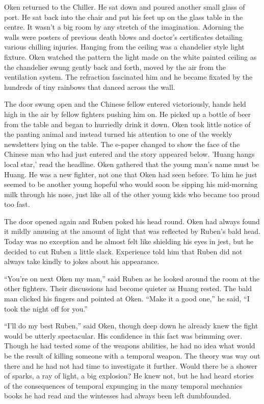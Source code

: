 Oken returned to the Chiller. He sat down and poured another small glass of port. He sat back into the chair and put his feet up on the glass table in the centre. It wasn't a big room by any stretch of the imagination. Adorning the walls were posters of previous death blows and doctor's certificates detailing various chilling injuries. Hanging from the ceiling was a chandelier style light fixture. Oken watched the pattern the light made on the white painted ceiling as the chandelier swung gently back and forth, moved by the air from the ventilation system. The refraction fascinated him and he became fixated by the hundreds of tiny rainbows that danced across the wall.

The door swung open and the Chinese fellow entered victoriously, hands held high in the air by fellow fighters pushing him on. He picked up a bottle of beer from the table and began to hurriedly drink it down. Oken took little notice of the panting animal and instead turned his attention to one of the weekly newsletters lying on the table. The e-paper changed to show the face of the Chinese man who had just entered and the story appeared below. 'Huang hangs local star,' read the headline. Oken gathered that the young man's name must be Huang. He was a new fighter, not one that Oken had seen before. To him he just seemed to be another young hopeful who would soon be sipping his mid-morning milk through his nose, just like all of the other young kids who became too proud too fast.

The door opened again and Ruben poked his head round. Oken had always found it mildly amusing at the amount of light that was reflected by Ruben's bald head. Today was no exception and he almost felt like shielding his eyes in jest, but he decided to cut Ruben a little slack. Experience told him that Ruben did not always take kindly to jokes about his appearance.

``You're on next Oken my man,'' said Ruben as he looked around the room at the other fighters. Their discussions had become quieter as Huang rested. The bald man clicked his fingers and pointed at Oken. ``Make it a good one,'' he said, ``I took the night off for you.''

``I'll do my best Ruben,'' said Oken, though deep down he already knew the fight would be utterly spectacular. His confidence in this fact was brimming over. Though he had tested some of the weapons abilities, he had no idea what would be the result of killing someone with a temporal weapon. The theory was way out there and he had not had time to investigate it further. Would there be a shower of sparks, a ray of light, a big explosion? He knew not, but he had heard stories of the consequences of temporal expunging in the many temporal mechanics books he had read and the wintesses had always been left dumbfounded.

